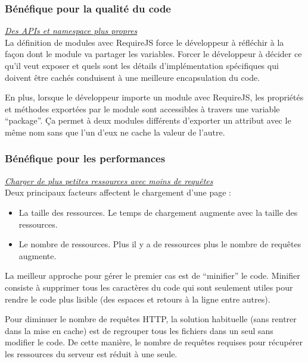 

\subsubsection{Bénéfique pour la qualité du code}

\textit{\underline{Des APIs et namespace plus propres}}\\

La définition de modules avec RequireJS force le développeur à réfléchir à la
façon dont le module va partager les variables. Forcer le développeur à décider
ce qu'il veut exposer et quels sont les détails d'implémentation spécifiques
qui doivent être cachés conduisent à une meilleure encapsulation du code.

En plus, lorsque le développeur importe un module avec RequireJS, les propriétés
et méthodes exportées par le module sont accessibles à travers une variable
``package''. Ça permet à deux modules différents d'exporter un attribut avec le
même nom sans que l'un d'eux ne cache la valeur de l'autre.


\subsubsection{Bénéfique pour les performances}

\textit{\underline{Charger de plus petites ressources avec moins de requêtes}}\\

Deux principaux facteurs affectent le chargement d'une page :
\begin{itemize}
\item La taille des ressources. Le temps de chargement augmente avec la taille
  des ressources.
\item Le nombre de ressources. Plus il y a de ressources plus le nombre de
  requêtes augmente.
\end{itemize}

La meilleur approche pour gérer le premier cas est de ``minifier'' le code.
Minifier consiste à supprimer tous les caractères du code qui sont seulement
utiles pour rendre le code plus lisible (des espaces et retours à la ligne
entre autres).

Pour diminuer le nombre de requêtes HTTP, la solution habituelle (sans rentrer
dans la mise en cache) est de regrouper tous les fichiers dans un seul sans
modifier le code. De cette manière, le nombre de requêtes requises pour
récupérer les ressources du serveur est réduit à une seule.

